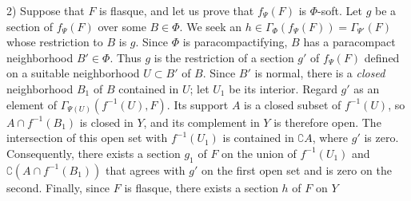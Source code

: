 2) Suppose that $F$ is flasque, and let us prove that $f_\Psi(F)$ is
$\Phi$-soft. Let $g$ be a section of $f_\Psi(F)$ over some $B\in\Phi$. We
seek an $h\in\Gamma_\Phi(f_\Psi(F))=\Gamma_{\Psi'}(F)$ whose restriction to
$B$ is $g$. Since $\Phi$ is paracompactifying, $B$ has a paracompact
neighborhood $B'\in\Phi$. Thus $g$ is the restriction of a section $g'$ of
$f_\Psi(F)$ defined on a suitable neighborhood $U\subset B'$ of $B$. Since
$B'$ is normal, there is a \textit{closed} neighborhood $B_1$ of $B$ contained in
$U$; let $U_1$ be its interior.
Regard $g'$ as an element of $\Gamma_{\Psi(U)}(f^{-1}(U),F)$. Its support
$A$ is a closed subset of $f^{-1}(U)$, so $A\cap f^{-1}(B_1)$ is closed in
$Y$, and its complement in $Y$ is therefore open. The intersection of this
open set with $f^{-1}(U_1)$ is contained in $\complement A$, where $g'$ is zero.
Consequently, there exists a section $g_1$ of $F$ on the union of
$f^{-1}(U_1)$ and $\complement(A\cap f^{-1}(B_1))$ that agrees with $g'$ on the
first open set and is zero on the second. Finally, since $F$ is flasque, there
exists a section $h$ of $F$ on $Y$

